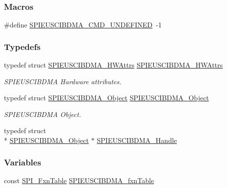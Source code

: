 \subsubsection*{Macros}
\begin{DoxyCompactItemize}
\item 
\#define \hyperlink{_s_p_i_e_u_s_c_i_b_d_m_a_8h_ae25e2191a88fc2e3a4cade82c5b7c2ea}{S\-P\-I\-E\-U\-S\-C\-I\-B\-D\-M\-A\-\_\-\-C\-M\-D\-\_\-\-U\-N\-D\-E\-F\-I\-N\-E\-D}~-\/1
\end{DoxyCompactItemize}
\subsubsection*{Typedefs}
\begin{DoxyCompactItemize}
\item 
typedef struct \hyperlink{struct_s_p_i_e_u_s_c_i_b_d_m_a___h_w_attrs}{S\-P\-I\-E\-U\-S\-C\-I\-B\-D\-M\-A\-\_\-\-H\-W\-Attrs} \hyperlink{_s_p_i_e_u_s_c_i_b_d_m_a_8h_a749c57472b0dd55a73f1cd1c6ef78927}{S\-P\-I\-E\-U\-S\-C\-I\-B\-D\-M\-A\-\_\-\-H\-W\-Attrs}
\begin{DoxyCompactList}\small\item\em S\-P\-I\-E\-U\-S\-C\-I\-B\-D\-M\-A Hardware attributes. \end{DoxyCompactList}\item 
typedef struct \hyperlink{struct_s_p_i_e_u_s_c_i_b_d_m_a___object}{S\-P\-I\-E\-U\-S\-C\-I\-B\-D\-M\-A\-\_\-\-Object} \hyperlink{_s_p_i_e_u_s_c_i_b_d_m_a_8h_a2ec8ab315cc978ab2308a24ba6b6f82f}{S\-P\-I\-E\-U\-S\-C\-I\-B\-D\-M\-A\-\_\-\-Object}
\begin{DoxyCompactList}\small\item\em S\-P\-I\-E\-U\-S\-C\-I\-B\-D\-M\-A Object. \end{DoxyCompactList}\item 
typedef struct \\*
\hyperlink{struct_s_p_i_e_u_s_c_i_b_d_m_a___object}{S\-P\-I\-E\-U\-S\-C\-I\-B\-D\-M\-A\-\_\-\-Object} $\ast$ \hyperlink{_s_p_i_e_u_s_c_i_b_d_m_a_8h_af48075210fdae29550dff1b9074cd29b}{S\-P\-I\-E\-U\-S\-C\-I\-B\-D\-M\-A\-\_\-\-Handle}
\end{DoxyCompactItemize}
\subsubsection*{Variables}
\begin{DoxyCompactItemize}
\item 
const \hyperlink{struct_s_p_i___fxn_table}{S\-P\-I\-\_\-\-Fxn\-Table} \hyperlink{_s_p_i_e_u_s_c_i_b_d_m_a_8h_acd20860a4e9835980bcee70691aa726a}{S\-P\-I\-E\-U\-S\-C\-I\-B\-D\-M\-A\-\_\-fxn\-Table}
\end{DoxyCompactItemize}


